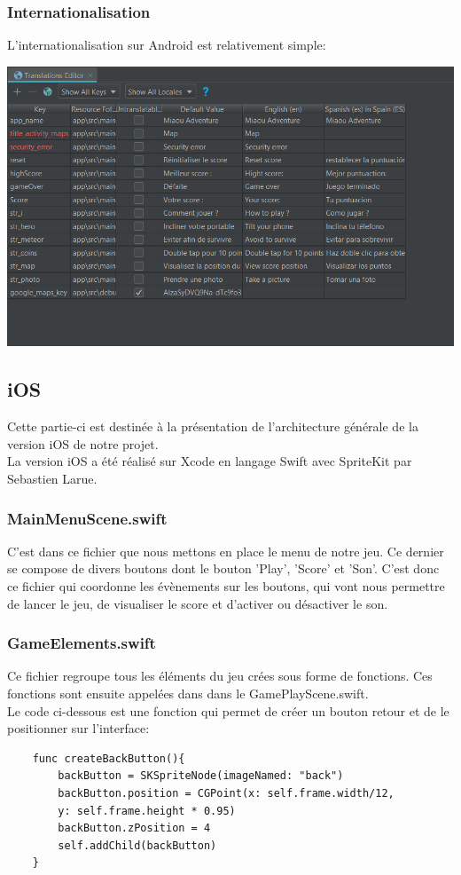 \documentclass{article}
\begin{document}
\subsubsection{Internationalisation}
L'internationalisation sur Android est relativement simple:
\begin{center}
    \includegraphics[scale = 0.7]{images/translate.PNG}
\end{center}


\newpage
\subsection{iOS}
Cette partie-ci est destinée à la présentation de l'architecture générale de la version iOS de notre projet.\\
La version iOS a été réalisé sur Xcode en langage Swift avec SpriteKit par Sebastien Larue.

\subsubsection{MainMenuScene.swift}
C'est dans ce fichier que nous mettons en place le menu de notre jeu. Ce dernier se compose de divers boutons dont le bouton 'Play', 'Score' et 'Son'. C'est donc ce fichier qui coordonne les évènements sur les boutons, qui vont nous permettre de lancer le jeu, de visualiser le score et d'activer ou désactiver le son.

\subsubsection{GameElements.swift}
Ce fichier regroupe tous les éléments du jeu crées sous forme de fonctions. Ces fonctions sont ensuite appelées dans dans le GamePlayScene.swift.\\
Le code ci-dessous est une fonction qui permet de créer un bouton retour et de le positionner sur l'interface: 
\begin{verbatim}
    func createBackButton(){
        backButton = SKSpriteNode(imageNamed: "back")
        backButton.position = CGPoint(x: self.frame.width/12, 
        y: self.frame.height * 0.95)
        backButton.zPosition = 4
        self.addChild(backButton)
    }
\end{verbatim}
\end{document}
